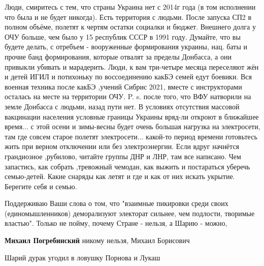 \begin{itemize}
Люди, смиритесь с тем, что страны Украина нет с 2014г года (в том исполнении
что была и не будет никогда). Есть территория с людьми. После запуска СП2 в
полном объёме, полетят к чертям остатки социалки и бюджет. Внешнего долга у ОЧУ
больше, чем было у 15 республик СССР в 1991 году. Думайте, что вы будете
делать, с отребъем - вооруженные формирования украины, нац. баты и прочие банд
формирования, которые отвалят за пределы Донбасса, а они привыкли убивать и
марадерить. Люди, к вам три-четыре месяца переселяют жён и детей ИГИЛ и
потихоньку по воссоединению какБЭ семей едут боевики. Вся военная техника после
какБЭ ,учений Сибрис 2021, вместе с инструкторами осталась на месте на
территории ОЧУ. P. s. после того, что ВФУ натворили на земле Донбасса с людьми,
назад пути нет. В условиях отсутствия массовой вакцинации населения условные
границы Украины вряд-ли откроют в ближайшее время... с этой осени и зимы-весны
будет очень большая нагрузка на электросети, там где совсем старое полетят
электросети... какой-то период времени готовьтесь жить при верном отключении
или без электроэнергии. Если вдруг начнётся грандиозное ,рубилово, читайте
группы ДНР и ЛНР, там все написано. Чем запастись, как собрать ,тревожный
чемодан, как выжить и постараться уберечь семью-детей. Какие снаряды как летят
и где и как от них искать укрытие. Берегите себя и семью.


 


Поддерживаю Ваши слова о том, что "взаимные пикировки среди своих
(единомышленников) деморализуют электорат сильнее, чем подлости, творимые
властью". Только не пойму, почему Стране - нельзя, а Шарию - можно,

\begin{itemize}
 
\textbf{Михаил Погребинский} никому нельзя, Михаил Борисович
\end{itemize}

 
Шарий дурак угодил в ловушку Порнова и Лукаш

\end{itemize}

